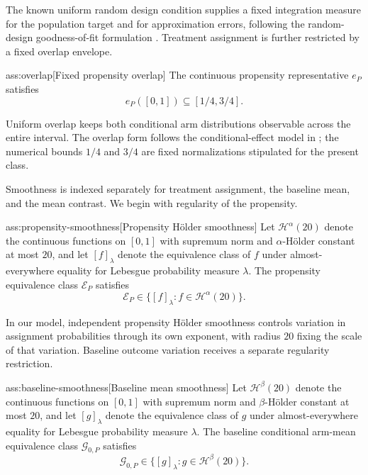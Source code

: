 The known uniform random design condition supplies a fixed integration measure for the population target and for approximation errors, following the random-design goodness-of-fit formulation \citep{IngsterSapatinas2009GoodnessOfFit}. Treatment assignment is further restricted by a fixed overlap envelope.

\begin{assumptionv}{ass:overlap}[Fixed propensity overlap]
The continuous propensity representative \(e_P\) satisfies
\[
e_P([0,1])\subseteq[1/4,3/4].
\]
\end{assumptionv}

Uniform overlap keeps both conditional arm distributions observable across the entire interval. The overlap form follows the conditional-effect model in \citet[Section 2]{KennedyBalakrishnanRobinsWasserman2024MinimaxCATE}; the numerical bounds \(1/4\) and \(3/4\) are fixed normalizations stipulated for the present class.

Smoothness is indexed separately for treatment assignment, the baseline mean, and the mean contrast. We begin with regularity of the propensity.

\begin{assumptionv}{ass:propensity-smoothness}[Propensity Hölder smoothness]
Let \(\mathcal H^\alpha(20)\) denote the continuous functions on \([0,1]\) with supremum norm and \(\alpha\)-Hölder constant at most \(20\), and let \([f]_\lambda\) denote the equivalence class of \(f\) under almost-everywhere equality for Lebesgue probability measure \(\lambda\). The propensity equivalence class \(\mathcal E_P\) satisfies
\[
\mathcal E_P\in\{[f]_\lambda:f\in\mathcal H^\alpha(20)\}.
\]
\end{assumptionv}

In our model, independent propensity Hölder smoothness controls variation in assignment probabilities through its own exponent, with radius \(20\) fixing the scale of that variation. Baseline outcome variation receives a separate regularity restriction.

\begin{assumptionv}{ass:baseline-smoothness}[Baseline mean smoothness]
Let \(\mathcal H^\beta(20)\) denote the continuous functions on \([0,1]\) with supremum norm and \(\beta\)-Hölder constant at most \(20\), and let \([g]_\lambda\) denote the equivalence class of \(g\) under almost-everywhere equality for Lebesgue probability measure \(\lambda\). The baseline conditional arm-mean equivalence class \(\mathcal G_{0,P}\) satisfies
\[
\mathcal G_{0,P}\in\{[g]_\lambda:g\in\mathcal H^\beta(20)\}.
\]
\end{assumptionv}


